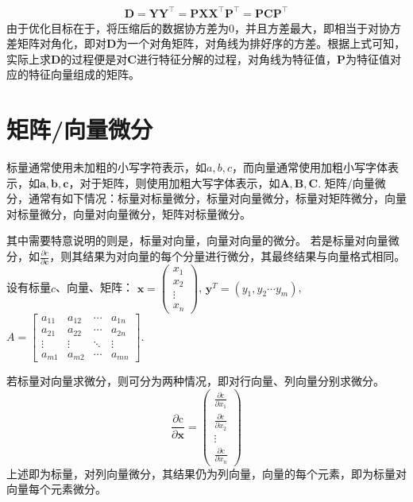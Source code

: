 \documentclass[12pt,a4paper]{article}
\begin{document}
  $$
  \begin{aligned}
    \mathbf{D}=\mathbf{Y} \mathbf{Y}^\top = \mathbf{P} \mathbf{X}\mathbf{X} ^\top  \mathbf{P}^\top = \mathbf{PC}\mathbf{P}^\top
  \end{aligned}
  $$
  由于优化目标在于，将压缩后的数据协方差为0，并且方差最大，即相当于对协方差矩阵对角化，即对$\mathbf{D}$为一个对角矩阵，对角线为排好序的方差。根据上式可知，实际上求$\mathbf{D}$的过程便是对$
  \mathbf{C}$进行特征分解的过程，对角线为特征值，$\mathbf{P}$为特征值对应的特征向量组成的矩阵。

  \section{矩阵/向量微分}
  标量通常使用未加粗的小写字符表示，如$a, b, c$，而向量通常使用加粗小写字体表示，如$\mathbf{a, b, c}$，对于矩阵，则使用加粗大写字体表示，如$\mathbf{A, B, C}$. 矩阵/向量微分，通常有如下情况：标量对标量微分，标量对向量微分，标量对矩阵微分，向量对标量微分，向量对向量微分，矩阵对标量微分。

  其中需要特意说明的则是，标量对向量，向量对向量的微分。
  若是标量对向量微分，如$\frac{\partial c}{\partial \mathbf{c}}$，则其结果为对向量的每个分量进行微分，其最终结果与向量格式相同。
  设有标量$c$、向量、矩阵：
  $\boldsymbol{x}=\left(\begin{array}{c}{x_{1}} \\ {x_{2}} \\ {\vdots} \\ {x_{n}}\end{array}\right)$, $\boldsymbol{y}^{T}=\left(y_{1}, y_{2} \cdots y_{m}\right)$, $A=\left[\begin{array}{cccc}{a_{11}} & {a_{12}} & {\cdots} & {a_{1 n}} \\ {a_{21}} & {a_{22}} & {\cdots} & {a_{2 n}} \\ {\vdots} & {\vdots} & {\ddots} & {\vdots} \\ {a_{m 1}} & {a_{m 2}} & {\cdots} & {a_{m n}}\end{array}\right]$.

  若标量对向量求微分，则可分为两种情况，即对行向量、列向量分别求微分。
  $$
  \frac{\partial \mathrm{c}}{\partial \boldsymbol{x}}=\left(\begin{array}{c}{\frac{\partial \mathrm{c}}{\partial x_{1}}} \\ {\frac{\partial \mathrm{c}}{\partial x_{2}}} \\ {\vdots} \\ {\frac{\partial \mathrm{c}}{\partial x_{n}}}\end{array}\right)
  $$
  上述即为标量，对列向量微分，其结果仍为列向量，向量的每个元素，即为标量对向量每个元素微分。
\end{document}

